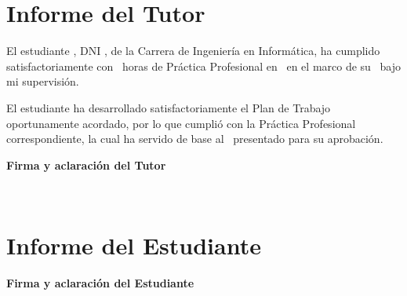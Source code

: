\section*{Informe del Tutor}

El estudiante \studentFullname, DNI \studentDni, de la Carrera de Ingeniería en Informática,
ha cumplido satisfactoriamente con \hoursPPS\ horas de Práctica Profesional en
\organizationPlace\ en el marco de su \workType\ bajo mi supervisión.
\vspace{0.25cm}

El estudiante ha desarrollado satisfactoriamente el Plan de Trabajo oportunamente
acordado, por lo que cumplió con la Práctica Profesional correspondiente, la cual ha
servido de base al \workType\ presentado para su aprobación.
\vspace{0.25cm}

\tasksDescription
\vspace{0.25cm}

\bigskip
\textbf{Firma y aclaración del Tutor}\\

\noindent\hspace*{-0.02\textwidth}\begin{minipage}[t]{0.65\textwidth}
\centering
\signatureBoxCentered{\tutorSignatureImage}{\tutorSignatureWidth}{\tutorSignatureHeight}\\
\vspace{0.15cm}
\tutorName
\end{minipage}

\newpage
\section*{Informe del Estudiante}

\studentOpinion

\bigskip
\textbf{Firma y aclaración del Estudiante}\\

\bigskip
\noindent\hspace*{-0.02\textwidth}\begin{minipage}[t]{0.65\textwidth}
\centering
\signatureBoxCentered{\studentSignatureImage}{\studentSignatureWidth}{\studentSignatureHeight}\\
\vspace{0.15cm}
\studentSignatureName
\end{minipage}

